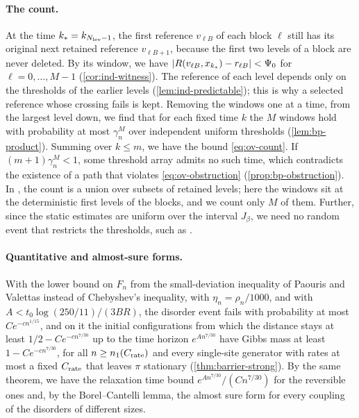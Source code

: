 \paragraph{The count.} At the time $k_*=k_{N_{\rm lev}-1}$, the first
reference $v_{\ell B}$ of each block $\ell$ still has its original next retained
reference $v_{\ell B+1}$, because the first two levels of a block are never
deleted. By its window, we have $\lvert R(v_{\ell B},x_{k_*})-r_{\ell B}\rvert<\Psi_0$ for
$\ell=0,\dots,M-1$ (\cref{cor:ind-witness}). The reference of each level depends
only on the thresholds of the earlier levels (\cref{lem:ind-predictable}); this
is why a selected reference whose crossing fails is kept. Removing the windows
one at a time, from the largest level down, we find that for each fixed time
$k$ the $M$ windows hold with probability at most $\gamma_n^M$ over independent
uniform thresholds (\cref{lem:bp-product}). Summing over $k\le m$, we have the
bound \eqref{eq:ov-count}. If $(m+1)\gamma_n^M<1$, some threshold array admits no such
time, which contradicts the existence of a path that violates
\eqref{eq:ov-obstruction} (\cref{prop:bp-obstruction}). In \cite[(8.29)]{oai-barriers}, the count is a union over
subsets of retained levels; here the windows sit at the deterministic first
levels of the blocks, and we count only $M$ of them. Further, since the
static estimates are uniform over the interval $J_\beta$, we need no random
event that restricts the thresholds, such as \cite[(8.12)]{oai-barriers}.

\paragraph{Quantitative and almost-sure forms.} With the lower bound on $F_n$
from the small-deviation inequality of Paouris and Valettas
\cite[Theorem~2.1 and Remark~2.4(3)]{paouris-valettas-2018} instead of
Chebyshev's inequality, with $\eta_n=\rho_n/1000$, and with
$A<t_0\log(250/11)/(3BR)$, the disorder event fails with probability at most
$Ce^{-cn^{1/15}}$, and on it the initial configurations from which the
distance stays at least $1/2-Ce^{-cn^{7/30}}$ up to the time horizon
$e^{An^{7/30}}$ have Gibbs mass at least $1-Ce^{-cn^{7/30}}$, for all
$n\ge n_1(C_{\rm rate})$ and every single-site generator with rates at most a
fixed $C_{\rm rate}$ that leaves $\pi$ stationary (\cref{thm:barrier-strong}).
By the same theorem, we have the relaxation time bound
$e^{An^{7/30}}/(Cn^{7/30})$ for the reversible ones and, by the
Borel--Cantelli lemma, the almost sure form for every coupling of the
disorders of different sizes.

